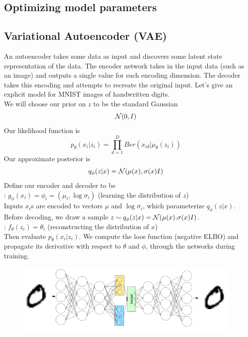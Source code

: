 \documentclass[11pt]{article}
\begin{document}
\subsection{Optimizing model parameters}

\subsection{Variational Autoencoder (VAE)}
An autoencoder takes some data as input and discovers some latent state representation of the data. The encoder network takes in the input data (such as an image) and outputs a single value for each encoding dimension. The decoder takes this encoding and attempts to recreate the original input. 
Let's give an explicit model for MNIST images of handwritten digits.\\
We will choose our prior on $z$ to be the standard Gaussian $$\mathcal{N}(0,I)$$
Our likelihood function is
$$p_{\theta}(x_i|z_i) = \prod_{d=1}^D Ber(x_{id}|\mu_{\theta}(z_i))$$
Our approximate posterior is
$$q_\phi(z|x) = \mathcal{N}(\mu(x), \sigma(x)I)$$
Define our encoder and decoder to be\\
: $g_\phi(x_i) = \phi_i = (\mu_i, \log \sigma_i)$ (learning the distribution of $z$)\\
Inputs $x_i$s are encoded to vectors $\mu$ and $\log \sigma_i$, which parameterize $q_\phi(z|x)$. Before decoding, we draw a sample $z \sim q_\phi(z|x) = \mathcal{N}(\mu(x). \sigma(x)I)$.\\
: $f_\theta(z_i) = \theta_i$ (reconstructing the distribution of $x$)\\
Then evaluate $p_\theta(x_i|z_i)$. We compute the loos function (negative ELBO) and propagate its derivative with respect to $\theta$ and $\phi$, through the networks during training.

\begin{figure}[H]
	\centering
	\includegraphics[scale=0.6]{p12.png}
\end{figure}
\end{document}
